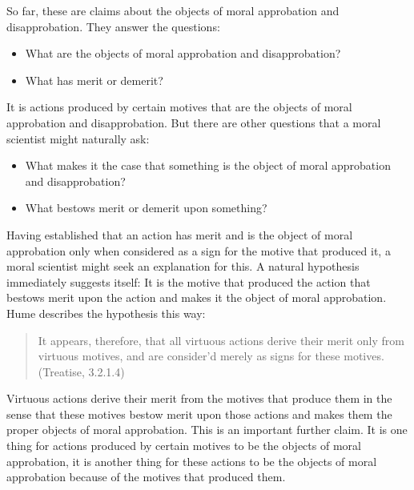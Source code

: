 So far, these are claims about the objects of moral approbation and disapprobation. They answer the questions:
\begin{itemize}
    \item What are the objects of moral approbation and disapprobation?
    \item What has merit or demerit?
\end{itemize}
It is actions produced by certain motives that are the objects of moral approbation and disapprobation. But there are other questions that a moral scientist might naturally ask:
\begin{itemize}
    \item What makes it the case that something is the object of moral approbation and disapprobation?
    \item What bestows merit or demerit upon something?
\end{itemize}
Having established that an action has merit and is the object of moral approbation only when considered as a sign for the motive that produced it, a moral scientist might seek an explanation for this. A natural hypothesis immediately suggests itself: It is the motive that produced the action that bestows merit upon the action and makes it the object of moral approbation. Hume describes the hypothesis this way:
\begin{quote}
    It appears, therefore, that all virtuous actions derive their merit only from virtuous motives, and are consider’d merely as signs for these motives. (Treatise, 3.2.1.4)
\end{quote}
Virtuous actions derive their merit from the motives that produce them in the sense that these motives bestow merit upon those actions and makes them the proper objects of moral approbation. This is an important further claim. It is one thing for actions produced by certain motives to be the objects of moral approbation, it is another thing for these actions to be the objects of moral approbation because of the motives that produced them. \change

% 

